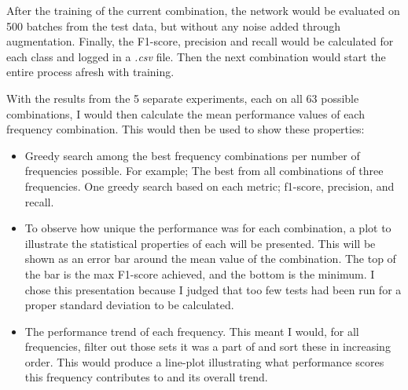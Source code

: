         After the training of the current combination, the network would be evaluated on 500 batches from the test data, but without any noise added through augmentation. Finally, the F1-score, precision and recall would be calculated for each class and logged in a \textit{.csv} file. Then the next combination would start the entire process afresh with training.
        
        With the results from the 5 separate experiments, each on all 63 possible combinations, I would then calculate the mean performance values of each frequency combination. This would then be used to show these properties:
        \begin{itemize}

            \item Greedy search among the best frequency combinations per number of frequencies possible. For example; The best from all combinations of three frequencies. One greedy search based on each metric; f1-score, precision, and recall.
            \item To observe how unique the performance was for each combination, a plot to illustrate the statistical properties of each will be presented. This will be shown as an error bar around the mean value of the combination. The top of the bar is the max F1-score achieved, and the bottom is the minimum. I chose this presentation because I judged that too few tests had been run for a proper standard deviation to be calculated.
            \item The performance trend of each frequency. This meant I would, for all frequencies, filter out those sets it was a part of and sort these in increasing order. This would produce a line-plot illustrating what performance scores this frequency contributes to and its overall trend.
        \end{itemize}
        
    
        

